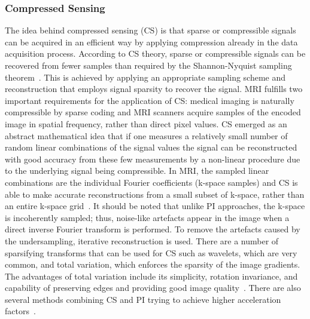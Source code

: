 \subsubsection{Compressed Sensing}
The idea behind compressed sensing (CS) is that sparse or compressible signals can be acquired in an efficient way by applying compression already in the data acquisition process. According to CS theory, sparse or compressible signals can be recovered from fewer samples than required by the Shannon-Nyquist sampling theorem~\cite{CS-MRI}. This is achieved by applying an appropriate sampling scheme and reconstruction that employs signal sparsity to recover the signal. MRI fulfills two important requirements for the application of CS: medical imaging is naturally compressible by sparse coding and MRI scanners acquire samples of the encoded image in spatial frequency, rather than direct pixel values. CS emerged as an abstract mathematical idea that if one measures a relatively small number of random linear combinations of the signal values the signal can be reconstructed with good accuracy from these few measurements by a non-linear procedure due to the underlying signal being compressible.
In MRI, the sampled linear combinations are the individual Fourier coefficients (k-space samples) and CS is able to make accurate reconstructions from a small subset of k-space, rather than an entire k-space grid~\cite{CS-MRI}. It should be noted that unlike PI approaches, the k-space is incoherently sampled; thus, noise-like artefacts appear in the image when a direct inverse Fourier transform is performed. To remove the artefacts caused by the undersampling, iterative reconstruction is used. There are a number of sparsifying transforms that can be used for CS such as wavelets, which are very common, and total variation, which enforces the sparsity of the image gradients. The advantages of total variation include its simplicity, rotation invariance, and capability of preserving edges and providing good image quality~\cite{PulseSequences}. There are also several methods combining CS and PI trying to achieve higher acceleration factors~\cite{PI+CS, PI+CS2}.

